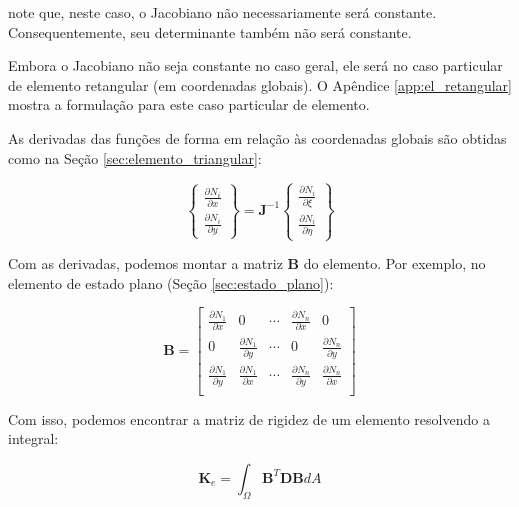         \noindent note que, neste caso, o Jacobiano não necessariamente será constante. Consequentemente, seu determinante também não será constante.

        Embora o Jacobiano não seja constante no caso geral, ele será no caso particular de elemento retangular (em coordenadas globais). O Apêndice \ref{app:el_retangular} mostra a formulação para este caso particular de elemento.


        As derivadas das funções de forma em relação às coordenadas globais são obtidas como na Seção \ref{sec:elemento_triangular}:

        \begin{equation}
            \begin{Bmatrix}
                \frac{\partial N_i}{\partial x} \\
                \frac{\partial N_i}{\partial y}
            \end{Bmatrix} = 
            \mathbf{J}^{-1}
            \begin{Bmatrix}
                \frac{\partial N_i}{\partial \xi} \\
                \frac{\partial N_i}{\partial \eta}
            \end{Bmatrix}
        \end{equation}

        Com as derivadas, podemos montar a matriz $\mathbf{B}$ do elemento. Por exemplo, no elemento de estado plano (Seção \ref{sec:estado_plano}):

        \begin{equation}
            \mathbf{B} = 
            \begin{bmatrix}
                \frac{\partial N_1}{\partial x} & 0 & \cdots & \frac{\partial N_n}{\partial x} & 0\\
                0 & \frac{\partial N_1}{\partial y} & \cdots & 0 & \frac{\partial N_n}{\partial y}\\
                \frac{\partial N_1}{\partial y} & \frac{\partial N_1}{\partial x} & \cdots & \frac{\partial N_n}{\partial y} & \frac{\partial N_n}{\partial x}\\
            \end{bmatrix}
        \end{equation}

        Com isso, podemos encontrar a matriz de rigidez de um elemento resolvendo a integral:

        \begin{equation}
            \mathbf{K}_e = \int_\Omega  \mathbf{B}^T \mathbf{D} \mathbf{B} dA
        \end{equation}

